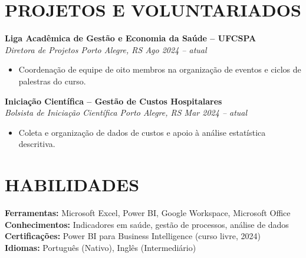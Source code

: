 \documentclass[a4paper,10pt]{article}
\newcommand{\entry}[2]{\noindent\textbf{#1}\\ \textit{#2}\par\vspace{0.15em}}
\begin{document}
\section{PROJETOS E VOLUNTARIADOS}
\entry{Liga Acadêmica de Gestão e Economia da Saúde -- UFCSPA}{Diretora de Projetos \textbullet{} Porto Alegre, RS \textbullet{} Ago 2024 -- atual}
\begin{itemize}
    \item Coordenação de equipe de oito membros na organização de eventos e ciclos de palestras do curso.
\end{itemize}

\entry{Iniciação Científica -- Gestão de Custos Hospitalares}{Bolsista de Iniciação Científica \textbullet{} Porto Alegre, RS \textbullet{} Mar 2024 -- atual}
\begin{itemize}
    \item Coleta e organização de dados de custos e apoio à análise estatística descritiva.
\end{itemize}

\section{HABILIDADES}
\textbf{Ferramentas:} Microsoft Excel, Power BI, Google Workspace, Microsoft Office\\
\textbf{Conhecimentos:} Indicadores em saúde, gestão de processos, análise de dados\\
\textbf{Certificações:} Power BI para Business Intelligence (curso livre, 2024)\\
\textbf{Idiomas:} Português (Nativo), Inglês (Intermediário)
\end{document}
